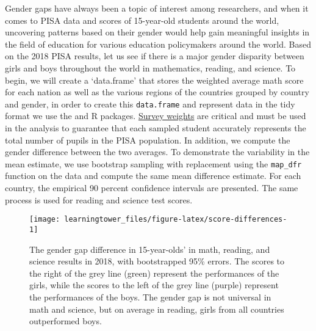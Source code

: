 Gender gaps have always been a topic of interest among researchers, and when it comes to PISA data and scores of 15-year-old students around the world, uncovering patterns based on their gender would help gain meaningful insights in the field of education for various education policymakers around the world. Based on the 2018 PISA results, let us see if there is a major gender disparity between girls and boys throughout the world in mathematics, reading, and science. To begin, we will create a `data.frame' that stores the weighted average math score for each nation as well as the various regions of the countries grouped by country and gender, in order to create this \texttt{data.frame} and represent data in the tidy format we use the  \citep{tidyverse} and  \citep{dplyr} R packages. \href{https://www.oecd.org/pisa/data/2015-technical-report/PISA-2015-Technical-Report-Chapter-8-Survey-Weighting.pdf}{Survey weights} are critical and must be used in the analysis to guarantee that each sampled student accurately represents the total number of pupils in the PISA population. In addition, we compute the gender difference between the two averages. To demonstrate the variability in the mean estimate, we use bootstrap sampling with replacement using the \texttt{map\_dfr} function on the data and compute the same mean difference estimate. For each country, the empirical 90 percent confidence intervals are presented. The same process is used for reading and science test scores.

\begin{figure}[H]
\texttt{[image: learningtower\_files/figure-latex/score-differences-1]} \caption{The gender gap difference in 15-year-olds' in math, reading, and science results in 2018, with bootstrapped 95\% errors. The scores to the right of the grey line (green) represent the performances of the girls, while the scores to the left of the grey line (purple) represent the performances of the boys. The gender gap is not universal in math and science, but on average in reading, girls from all countries outperformed boys.}\label{fig:score-differences}
\end{figure}

